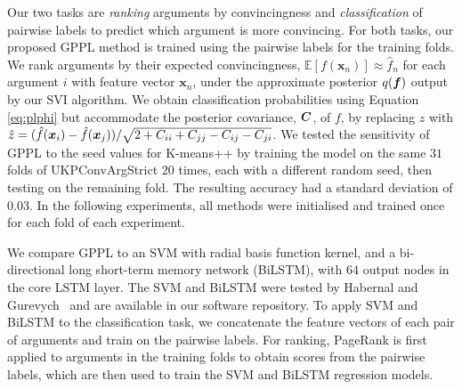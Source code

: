 Our two tasks are \emph{ranking} arguments by convincingness and  
\emph{classification} of pairwise labels to predict which argument is more convincing. 
For both tasks, our proposed GPPL method is trained using the pairwise labels for the training folds.
We rank arguments by their expected convincingness, $\mathbb{E}[f(\mathbf{x}_n)]\approx \hat{f}_n$ for each argument $i$ with feature vector $\mathbf{x}_n$, under the approximate posterior $q(\boldsymbol f)$
output by our SVI algorithm.
We obtain classification probabilities using Equation \ref{eq:plphi} but 
accommodate the posterior covariance, $\boldsymbol C$, of $f$, by replacing $z$ with $\hat{z} = (\hat{f}(\boldsymbol x_i) - \hat{f}(\boldsymbol x_j)) / \sqrt{2 + C_{ii} + C_{jj} - C_{ij} - C_{ji}}$.
We tested the sensitivity of GPPL to the seed values for K-means++ by training the model on the same $31$ folds of UKPConvArgStrict $20$ times, each with a different random seed, then testing on the remaining fold.
The resulting accuracy had a standard deviation of $0.03$. 
In the following experiments, all methods were initialised and trained once for each fold of each experiment.

We compare GPPL to an SVM with radial basis function kernel, 
and a bi-directional long short-term memory network (BiLSTM),
with $64$ output nodes in the core LSTM layer. 
The SVM and BiLSTM were tested by Habernal and Gurevych~ and are available in our software repository.
To apply SVM and BiLSTM to the classification task, we concatenate the feature vectors of each pair of arguments and train on the pairwise labels.
For ranking, PageRank is first applied to arguments in the training folds to obtain scores from the pairwise labels,
which are then used to train the SVM and BiLSTM regression models.



